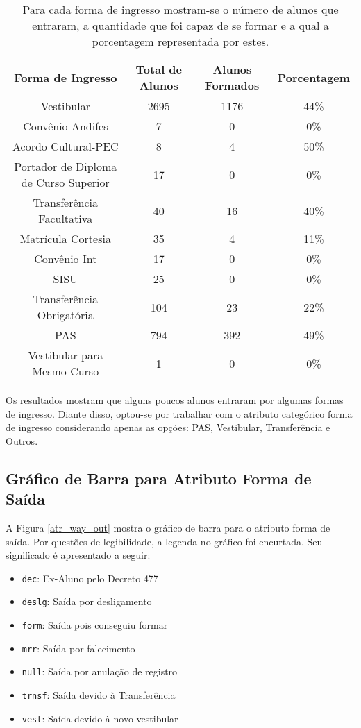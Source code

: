 \begin{table}
\begin{center}
\begin{tabular}[c]{| c | c | c | c |}
    \hline
    Forma de Ingresso & Total de Alunos & Alunos Formados & Porcentagem \\
    \hline
    Vestibular & 2695 & 1176 & 44\% \\
    \hline
    Convênio Andifes & 7 & 0 & 0\% \\
    \hline
    Acordo Cultural-PEC & 8 & 4 & 50\% \\
    \hline
    Portador de Diploma de Curso Superior & 17 & 0 & 0\% \\
    \hline
    Transferência Facultativa & 40 & 16 & 40\% \\
    \hline
    Matrícula Cortesia & 35 & 4 & 11\% \\
    \hline
    Convênio Int & 17 & 0 & 0\% \\
    \hline
    SISU & 25 & 0 & 0\% \\
    \hline
    Transferência Obrigatória & 104 & 23 & 22\% \\
    \hline
    PAS & 794 & 392 & 49\% \\
    \hline
    Vestibular para Mesmo Curso & 1 & 0 & 0\% \\
    \hline
\end{tabular}
\end{center}
\caption{Para cada forma de ingresso mostram-se o número de alunos que
entraram, a quantidade que foi capaz de se formar e a qual a porcentagem representada
por estes.}
\label{tab_way_in}
\end{table}

Os resultados mostram que alguns poucos alunos entraram por algumas formas de
ingresso. Diante disso, optou-se por trabalhar com o atributo categórico forma de
ingresso considerando apenas as opções: PAS, Vestibular, Transferência e Outros. 
 
\subsection{Gráfico de Barra para Atributo Forma de Saída}
A Figura \ref{atr_way_out} mostra o gráfico de barra para o atributo forma de saída. 
Por questões de legibilidade, a legenda no gráfico foi encurtada. Seu significado é
apresentado a seguir: 
\begin{itemize}
    \item \texttt{dec}: Ex-Aluno pelo Decreto 477
    \item \texttt{deslg}: Saída por desligamento
    \item \texttt{form}: Saída pois conseguiu formar
    \item \texttt{mrr}: Saída por falecimento
    \item \texttt{null}: Saída por anulação de registro
    \item \texttt{trnsf}: Saída devido à Transferência
    \item \texttt{vest}: Saída devido à novo vestibular
\end{itemize}

